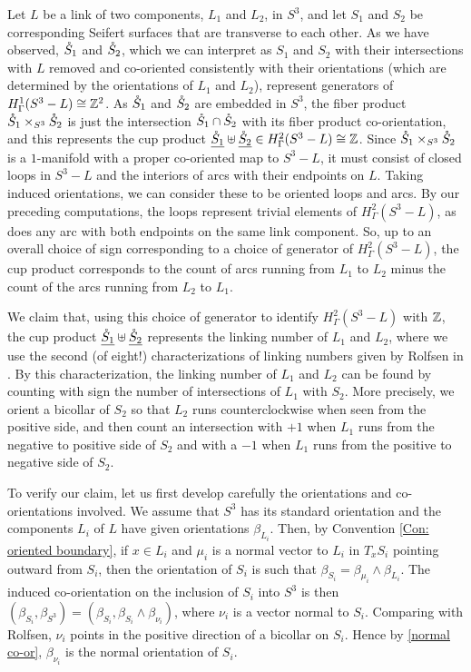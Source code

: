 Let $L$ be a link of two components, $L_1$ and $L_2$, in $S^3$, and let $S_1$ and $S_2$ be corresponding Seifert surfaces that are transverse to each other.
As we have observed, $\mathring{S}_1$ and $\mathring{S}_2$, which we can interpret as $S_1$ and $S_2$ with their intersections with $L$ removed and co-oriented consistently with their orientations (which are determined by the orientations of $L_1$ and $L_2$), represent generators of $H^1_\Gamma(S^3-L) \cong \mathbb{Z}^2$.
As $\mathring{S}_1$ and $\mathring{S}_2$ are embedded in $S^3$, the fiber product $\mathring{S}_1 \times_{S^3} \mathring{S}_2$ is just the intersection $\mathring{S}_1 \cap \mathring{S}_2$ with its fiber product co-orientation, and this represents the cup product $\underline{\mathring{S}_1} \uplus \underline{\mathring{S}_2} \in H^2_\Gamma(S^3-L) \cong \mathbb{Z}$.
Since $\mathring{S}_1 \times_{S^3} \mathring{S}_2$ is a $1$-manifold with a proper co-oriented map to $S^3-L$, it must consist of closed loops in $S^3-L$ and the interiors of arcs with their endpoints on $L$.
Taking induced orientations, we can consider these to be oriented loops and arcs.
By our preceding computations, the loops represent trivial elements of $H^2_\Gamma(S^3-L)$, as does any arc with both endpoints on the same link component.
So, up to an overall choice of sign corresponding to a choice of generator of $H^2_\Gamma(S^3-L)$, the cup product corresponds to the count of arcs running from $L_1$ to $L_2$ minus the count of the arcs running from $L_2$ to $L_1$.

We claim that, using this choice of generator to identify $H^2_\Gamma(S^3-L)$ with $\mathbb{Z}$, the cup product $\underline{\mathring{S}_1} \uplus \underline{\mathring{S}_2}$ represents the linking number of $L_1$ and $L_2$, where we use the second (of eight!) characterizations of linking numbers given by Rolfsen in \cite[Section 5D]{Ro90}.
By this characterization, the linking number of $L_1$ and $L_2$ can be found by counting with sign the number of intersections of $L_1$ with $S_2$.
More precisely, we orient a bicollar of $S_2$ so that $L_2$ runs counterclockwise when seen from the positive side, and then count an intersection with $+1$ when $L_1$ runs from the negative to positive side of $S_2$ and with a $-1$ when $L_1$ runs from the positive to negative side of $S_2$.

To verify our claim, let us first develop carefully the orientations and co-orientations involved.
We assume that $S^3$ has its standard orientation and the components $L_i$ of $L$ have given orientations $\beta_{L_i}$.
Then, by Convention \ref{Con: oriented boundary}, if $x \in L_i$ and $\mu_i$ is a normal vector to $L_i$ in $T_xS_i$ pointing outward from $S_i$, then the orientation of $S_i$ is such that $\beta_{S_i} = \beta_{\mu_i} \wedge \beta_{L_i}$.
The induced co-orientation on the inclusion of $S_i$ into $S^3$ is then $(\beta_{S_i}, \beta_{S^3}) = (\beta_{S_i}, \beta_{S_i} \wedge \beta_{\nu_i})$, where $\nu_i$ is a vector normal to $S_i$.
Comparing with Rolfsen, $\nu_i$ points in the positive direction of a bicollar on $S_i$.
Hence by \cref{normal co-or}, $\beta_{\nu_i}$ is the normal orientation of $S_i$.


